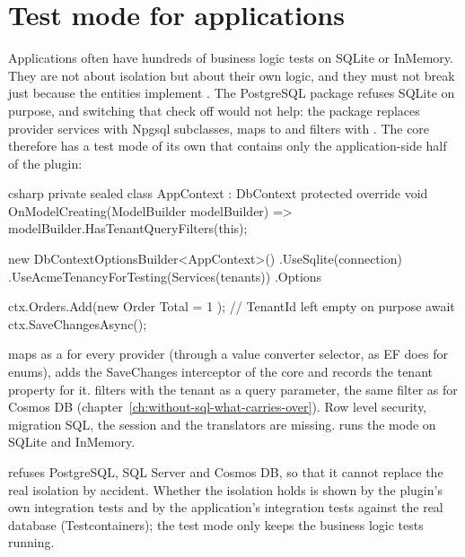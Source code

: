 \section{Test mode for applications}

Applications often have hundreds of business logic tests on SQLite or InMemory. They are not
about isolation but about their own logic, and they must not break just because the entities
implement . The PostgreSQL package refuses SQLite on purpose,
and switching that check off would not help: the package replaces provider services with
Npgsql subclasses, maps  to  and filters with
. The core therefore has a test mode of its
own that contains only the application-side half of the plugin:

\begin{sourcecode}{csharp}
private sealed class AppContext : DbContext
{
    protected override void OnModelCreating(ModelBuilder modelBuilder)
        => modelBuilder.HasTenantQueryFilters(this);
}

new DbContextOptionsBuilder<AppContext>()
    .UseSqlite(connection)
    .UseAcmeTenancyForTesting(Services(tenants))
    .Options

ctx.Orders.Add(new Order { Total = 1 });      // TenantId left empty on purpose
await ctx.SaveChangesAsync();
\end{sourcecode}

maps  as a  for every provider (through a value
converter selector, as EF does for enums), adds the SaveChanges interceptor of the core and
records the tenant property for it.
 filters
with the tenant as a query parameter, the same filter as for Cosmos DB
(chapter~\ref{ch:without-sql-what-carries-over}). Row level security, migration SQL, the
session and the translators are missing. 
runs the mode on SQLite and InMemory.

\begin{important}
   refuses
  PostgreSQL, SQL Server and Cosmos DB, so that it cannot replace the real isolation by
  accident. Whether the isolation holds is shown by the plugin's own integration tests and by
  the application's integration tests against the real database (Testcontainers); the test
  mode only keeps the business logic tests running.
\end{important}

